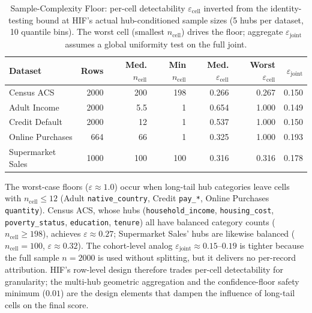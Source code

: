 \documentclass[pdflatex,sn-mathphys-num]{sn-jnl}
\theoremstyle{thmstyleone}%
\theoremstyle{thmstyletwo}%
\theoremstyle{thmstylethree}%
\begin{document}
\begin{appendices}
\begin{table}[htbp]
\centering
\caption{Sample-Complexity Floor: per-cell detectability $\varepsilon_{\text{cell}}$ inverted from the identity-testing bound at HIF's actual hub-conditioned sample sizes (5 hubs per dataset, 10 quantile bins). The worst cell (smallest $n_{\text{cell}}$) drives the floor; aggregate $\varepsilon_{\text{joint}}$ assumes a global uniformity test on the full joint.}
\label{tab:sample_complexity}
\footnotesize
\setlength{\tabcolsep}{2.5pt}
\begin{tabular}{@{}lrrrrrr@{}}
\toprule
Dataset & Rows & Med. $n_{\text{cell}}$ & Min $n_{\text{cell}}$ & Med. $\varepsilon_{\text{cell}}$ & Worst $\varepsilon_{\text{cell}}$ & $\varepsilon_{\text{joint}}$ \\
\midrule
Census ACS & 2000 & 200 & 198 & 0.266 & 0.267 & 0.150 \\
Adult Income & 2000 & 5.5 & 1 & 0.654 & 1.000 & 0.149 \\
Credit Default & 2000 & 12 & 1 & 0.537 & 1.000 & 0.150 \\
Online Purchases & 664 & 66 & 1 & 0.325 & 1.000 & 0.193 \\
Supermarket Sales & 1000 & 100 & 100 & 0.316 & 0.316 & 0.178 \\
\bottomrule
\end{tabular}
\end{table}

The worst-case floors ($\varepsilon \approx 1.0$) occur when long-tail hub categories leave cells with $n_{\text{cell}} \le 12$ (Adult \texttt{native\_country}, Credit \texttt{pay\_*}, Online Purchases \texttt{quantity}). Census ACS, whose hubs (\texttt{household\_income}, \texttt{housing\_cost}, \texttt{poverty\_status}, \texttt{education}, \texttt{tenure}) all have balanced category counts ($n_{\text{cell}} \ge 198$), achieves $\varepsilon \approx 0.27$; Supermarket Sales' hubs are likewise balanced ($n_{\text{cell}} = 100$, $\varepsilon \approx 0.32$). The cohort-level analog $\varepsilon_{\text{joint}} \approx 0.15$--$0.19$ is tighter because the full sample $n=2000$ is used without splitting, but it delivers no per-record attribution. HIF's row-level design therefore trades per-cell detectability for granularity; the multi-hub geometric aggregation and the confidence-floor safety minimum ($0.01$) are the design elements that dampen the influence of long-tail cells on the final score.


\end{appendices}
\end{document}
